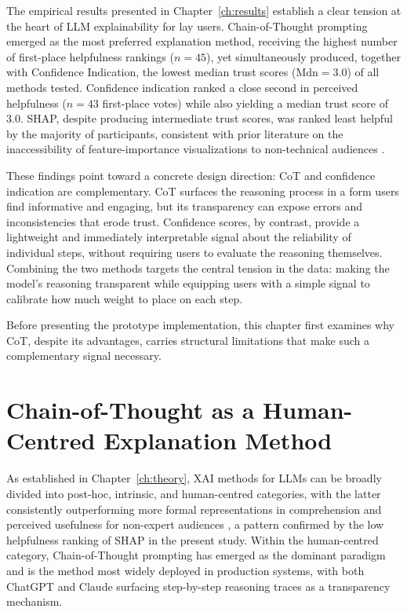 The empirical results presented in Chapter~\ref{ch:results} establish a clear tension at the
heart of LLM explainability for lay users. Chain-of-Thought prompting emerged as the most
preferred explanation method, receiving the highest number of first-place helpfulness rankings
($n = 45$), yet simultaneously produced, together with Confidence Indication, the lowest median trust scores ($\text{Mdn} = 3.0$)
of all methods tested. Confidence indication ranked a close second in perceived helpfulness
($n = 43$ first-place votes) while also yielding a median trust score of 3.0. SHAP, despite
producing intermediate trust scores, was ranked least helpful by the majority of participants,
consistent with prior literature on the inaccessibility of feature-importance visualizations to
non-technical audiences \cite{chromik_i_2021, kaur_interpreting_2020}.

These findings point toward a concrete design direction: CoT and confidence indication are
complementary. CoT surfaces the reasoning process in a form users find informative and
engaging, but its transparency can expose errors and inconsistencies that erode trust. Confidence
scores, by contrast, provide a lightweight and immediately interpretable signal about the
reliability of individual steps, without requiring users to evaluate the reasoning themselves.
Combining the two methods targets the central tension in the data: making the model's
reasoning transparent while equipping users with a simple signal to calibrate how much weight
to place on each step.

Before presenting the prototype implementation, this chapter first examines why CoT, despite
its advantages, carries structural limitations that make such a complementary signal necessary.

\section{Chain-of-Thought as a Human-Centred Explanation Method}
\label{sec:cot_research}

As established in Chapter~\ref{ch:theory}, XAI methods for LLMs can be broadly divided into post-hoc, intrinsic, and human-centred categories, with the latter consistently outperforming more formal representations in comprehension and perceived usefulness for non-expert audiences \cite{chromik_i_2021}, a pattern confirmed by the low helpfulness ranking of SHAP in the present study. Within the human-centred
category, Chain-of-Thought prompting has emerged as the dominant paradigm and is the method most widely deployed in production systems, with both ChatGPT and Claude surfacing step-by-step reasoning traces as a transparency mechanism.

